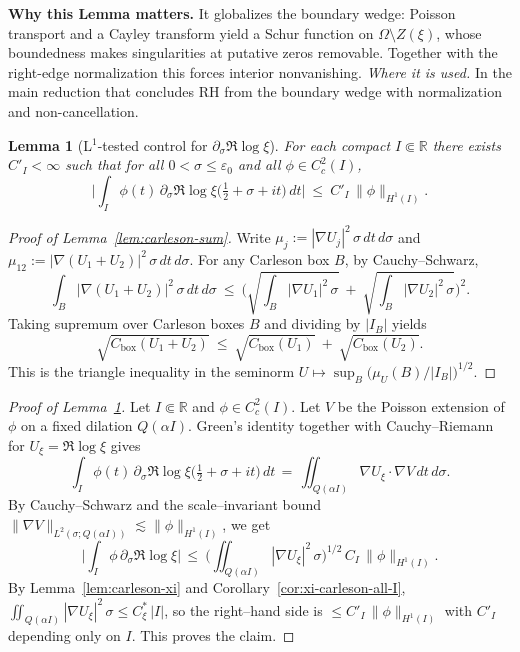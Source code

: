 \documentclass[11pt]{article}
\newtheorem{lemma}{Lemma}[section]
\theoremstyle{definition}
\theoremstyle{remark}
\newcommand{\R}{\mathbb{R}}
\begin{document}
\vspace{0.99cm}
\noindent\textbf{Why this Lemma matters.} It globalizes the boundary wedge: Poisson transport and a Cayley transform yield a Schur function on $\Omega\setminus Z(\xi)$, whose boundedness makes singularities at putative zeros removable. Together with the right-edge normalization this forces interior nonvanishing.
\noindent\textit{Where it is used.} In the main reduction that concludes RH from the boundary wedge with normalization and non-cancellation.
\begin{lemma}[L$^1$-tested control for $\partial_\sigma\Re\log\xi$]
\label{lem:xi-deriv-L1}
For each compact $I\Subset\R$ there exists $C'_I<\infty$ such that for all $0<\sigma\le\varepsilon_0$ and all $\phi\in C_c^2(I)$,
\[
\Big|\int_I \phi(t)\,\partial_\sigma\Re\log\xi\!\big(\tfrac12+\sigma+it\big)\,dt\Big|
\ \le\ C'_I\,\|\phi\|_{H^1(I)}.
\]
\end{lemma}

\begin{proof}[Proof of Lemma~\ref{lem:carleson-sum}]
Write $\mu_j:=|\nabla U_j|^2\,\sigma\,dt\,d\sigma$ and $\mu_{12}:=|\nabla(U_1{+}U_2)|^2\,\sigma\,dt\,d\sigma$. For any Carleson box $B$, by Cauchy–Schwarz,
\[
\int_{B} |\nabla(U_1+U_2)|^2\,\sigma\,dt\,d\sigma
\ \le\ \Big(\sqrt{\int_B |\nabla U_1|^2\,\sigma}\ +\ \sqrt{\int_B |\nabla U_2|^2\,\sigma}\Big)^{\!2}.
\]
Taking supremum over Carleson boxes $B$ and dividing by $|I_B|$ yields
\[
 \sqrt{C_{\mathrm{box}}(U_1{+}U_2)}\ \le\ \sqrt{C_{\mathrm{box}}(U_1)}\ +\ \sqrt{C_{\mathrm{box}}(U_2)}.
\]
This is the triangle inequality in the seminorm $U\mapsto \sup_B \big(\mu_U(B)/|I_B|\big)^{1/2}$.
\end{proof}

\begin{proof}[Proof of Lemma~\ref{lem:xi-deriv-L1}]
Let $I\Subset\R$ and $\phi\in C_c^2(I)$. Let $V$ be the Poisson extension of $\phi$ on a fixed dilation $Q(\alpha I)$. Green's identity together with Cauchy–Riemann for $U_\xi=\Re\log\xi$ gives
\[
  \int_I \phi(t)\,\partial_\sigma\Re\log\xi\!\big(\tfrac12+\sigma+it\big)\,dt
  \,=\, \iint_{Q(\alpha I)} \nabla U_\xi\cdot\nabla V\,dt\,d\sigma.
\]
By Cauchy–Schwarz and the scale–invariant bound $\|\nabla V\|_{L^2(\sigma;Q(\alpha I))}\lesssim \|\phi\|_{H^1(I)}$, we get
\[
  \Big|\int_I \phi\,\partial_\sigma\Re\log\xi\Big|
  \,\le\ \Big(\iint_{Q(\alpha I)}|\nabla U_\xi|^2\,\sigma\Big)^{\!1/2}\,C_I\,\|\phi\|_{H^1(I)}.
\]
By Lemma~\ref{lem:carleson-xi} and Corollary~\ref{cor:xi-carleson-all-I}, $\iint_{Q(\alpha I)}|\nabla U_\xi|^2\,\sigma\le C_\xi^{\!*}\,|I|$, so the right–hand side is $\le C'_I\,\|\phi\|_{H^1(I)}$ with $C'_I$ depending only on $I$. This proves the claim.
\end{proof}
\end{document}
